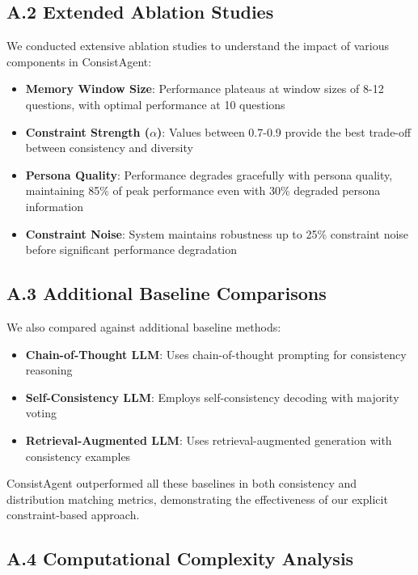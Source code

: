 \documentclass[sigconf, anonymous]{acmart}
\begin{document}
\subsection*{A.2 Extended Ablation Studies}

We conducted extensive ablation studies to understand the impact of various components in ConsistAgent:

\begin{itemize}
    \item \textbf{Memory Window Size}: Performance plateaus at window sizes of 8-12 questions, with optimal performance at 10 questions
    \item \textbf{Constraint Strength ($\alpha$)}: Values between 0.7-0.9 provide the best trade-off between consistency and diversity
    \item \textbf{Persona Quality}: Performance degrades gracefully with persona quality, maintaining 85\% of peak performance even with 30\% degraded persona information
    \item \textbf{Constraint Noise}: System maintains robustness up to 25\% constraint noise before significant performance degradation
\end{itemize}

\subsection*{A.3 Additional Baseline Comparisons}

We also compared against additional baseline methods:

\begin{itemize}
    \item \textbf{Chain-of-Thought LLM}: Uses chain-of-thought prompting for consistency reasoning
    \item \textbf{Self-Consistency LLM}: Employs self-consistency decoding with majority voting
    \item \textbf{Retrieval-Augmented LLM}: Uses retrieval-augmented generation with consistency examples
\end{itemize}

ConsistAgent outperformed all these baselines in both consistency and distribution matching metrics, demonstrating the effectiveness of our explicit constraint-based approach.

\subsection*{A.4 Computational Complexity Analysis}
\end{document}
